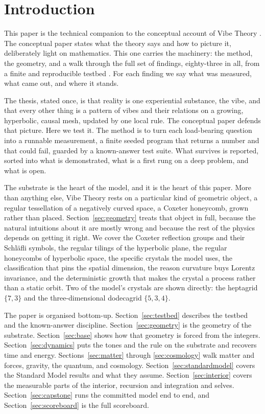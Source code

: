 \section{Introduction}
\label{sec:introduction}

This paper is the technical companion to the conceptual account of Vibe Theory \citep{pollard2026vibeconcept}.
The conceptual paper states what the theory says and how to picture it, deliberately light on
mathematics. This one carries the machinery: the method, the geometry, and a walk through the full
set of findings, eighty-three in all, from a finite and reproducible testbed \citep{pollard2026vibetest}. For
each finding we say what was measured, what came out, and where it stands.

The thesis, stated once, is that reality is one experiential substance, the vibe, and that every
other thing is a pattern of vibes and their relations on a growing, hyperbolic, causal mesh,
updated by one local rule. The conceptual paper defends that picture. Here we test it. The method
is to turn each load-bearing question into a runnable measurement, a finite seeded program that
returns a number and that could fail, guarded by a known-answer test suite. What survives is
reported, sorted into what is demonstrated, what is a first rung on a deep problem, and what is
open.

The substrate is the heart of the model, and it is the heart of this paper. More than anything
else, Vibe Theory rests on a particular kind of geometric object, a regular tessellation of a
negatively curved space, a Coxeter honeycomb, grown rather than placed. Section~\ref{sec:geometry}
treats that object in full, because the natural intuitions about it are mostly wrong and because
the rest of the physics depends on getting it right. We cover the Coxeter reflection groups and
their Schl\"afli symbols, the regular tilings of the hyperbolic plane, the regular honeycombs of
hyperbolic space, the specific crystals the model uses, the classification that pins the spatial
dimension, the reason curvature buys Lorentz invariance, and the deterministic growth that makes
the crystal a process rather than a static orbit. Two of the model's crystals are shown directly:
the heptagrid $\{7,3\}$ and the three-dimensional dodecagrid $\{5,3,4\}$.

The paper is organised bottom-up. Section~\ref{sec:testbed} describes the testbed and the
known-answer discipline. Section~\ref{sec:geometry} is the geometry of the substrate.
Section~\ref{sec:base} shows how that geometry is forced from the integers. Section~\ref{sec:dynamics}
puts the tones and the rule on the substrate and recovers time and energy.
Sections~\ref{sec:matter} through \ref{sec:cosmology} walk matter and forces, gravity, the quantum,
and cosmology. Section~\ref{sec:standardmodel} covers the Standard Model results and what they
assume. Section~\ref{sec:interior} covers the measurable parts of the interior, recursion and
integration and selves. Section~\ref{sec:capstone} runs the committed model end to end, and
Section~\ref{sec:scoreboard} is the full scoreboard.

